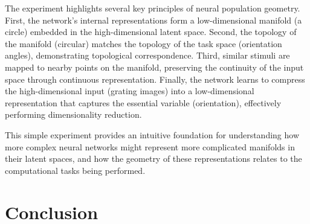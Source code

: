 \documentclass[11pt,a4paper]{article}
\begin{document}
The experiment highlights several key principles of neural population geometry. First, the network's internal representations form a low-dimensional manifold (a circle) embedded in the high-dimensional latent space. Second, the topology of the manifold (circular) matches the topology of the task space (orientation angles), demonstrating topological correspondence. Third, similar stimuli are mapped to nearby points on the manifold, preserving the continuity of the input space through continuous representation. Finally, the network learns to compress the high-dimensional input (grating images) into a low-dimensional representation that captures the essential variable (orientation), effectively performing dimensionality reduction.

This simple experiment provides an intuitive foundation for understanding how more complex neural networks might represent more complicated manifolds in their latent spaces, and how the geometry of these representations relates to the computational tasks being performed.

\section{Conclusion}



\end{document}
